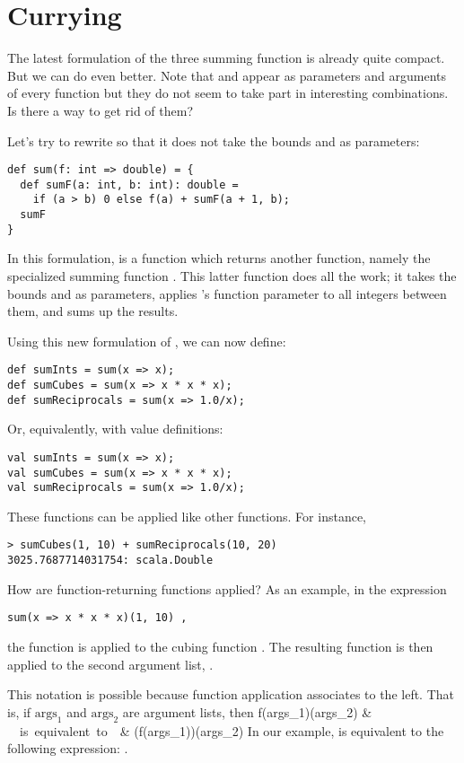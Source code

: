 \section{Currying}

The latest formulation of the three summing function is already quite
compact. But we can do even better. Note that
 and  appear as parameters and arguments of every function
but they do not seem to take part in interesting combinations. Is
there a way to get rid of them?

Let's try to rewrite  so that it does not take the bounds
 and  as parameters:
\begin{lstlisting}
def sum(f: int => double) = {
  def sumF(a: int, b: int): double = 
    if (a > b) 0 else f(a) + sumF(a + 1, b);
  sumF
}
\end{lstlisting}
In this formulation,  is a function which returns another
function, namely the specialized summing function . This
latter function does all the work; it takes the bounds  and
 as parameters, applies 's function parameter  to all
integers between them, and sums up the results. 

Using this new formulation of , we can now define:
\begin{lstlisting}
def sumInts = sum(x => x);
def sumCubes = sum(x => x * x * x);
def sumReciprocals = sum(x => 1.0/x);
\end{lstlisting}
Or, equivalently, with value definitions:
\begin{lstlisting}
val sumInts = sum(x => x);
val sumCubes = sum(x => x * x * x);
val sumReciprocals = sum(x => 1.0/x);
\end{lstlisting}
These functions can be applied like other functions. For instance,
\begin{lstlisting}
> sumCubes(1, 10) + sumReciprocals(10, 20)
3025.7687714031754: scala.Double
\end{lstlisting}
How are function-returning functions applied? As an example, in the expression
\begin{lstlisting}
sum(x => x * x * x)(1, 10) ,
\end{lstlisting}
the function  is applied to the cubing function 
. The resulting function is then 
applied to the second argument list, .

This notation is possible because function application associates to the left.
That is, if $\mbox{args}_1$ and $\mbox{args}_2$ are argument lists, then 
f(\mbox{args}_1)(\mbox{args}_2) & \ \ \mbox{is equivalent to}\ \ & (f(\mbox{args}_1))(\mbox{args}_2)
\eda
In our example,  is equivalent to the
following expression:
.

